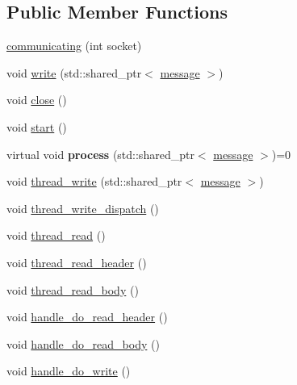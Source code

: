 \subsection*{Public Member Functions}
\begin{DoxyCompactItemize}
\item 
\hyperlink{classgal_1_1network_1_1communicating_adccfea2eeae7892217bf01f71f011d93}{communicating} (int socket)
\item 
void \hyperlink{classgal_1_1network_1_1communicating_ad839348b2caf46ddee874b78afaaeb1f}{write} (std\-::shared\-\_\-ptr$<$ \hyperlink{classgal_1_1network_1_1message}{message} $>$)
\item 
void \hyperlink{classgal_1_1network_1_1communicating_a3b39dcb940d746f44b6c2c72e198450d}{close} ()
\item 
void \hyperlink{classgal_1_1network_1_1communicating_a43bf55d2d11f1798b4814e069639a239}{start} ()
\item 
\hypertarget{classgal_1_1network_1_1communicating_a04bfdd09b09438aefb4683050437a211}{virtual void {\bfseries process} (std\-::shared\-\_\-ptr$<$ \hyperlink{classgal_1_1network_1_1message}{message} $>$)=0}\label{classgal_1_1network_1_1communicating_a04bfdd09b09438aefb4683050437a211}

\item 
void \hyperlink{classgal_1_1network_1_1communicating_ae183aa977aa6963e96a1abe2a94a749c}{thread\-\_\-write} (std\-::shared\-\_\-ptr$<$ \hyperlink{classgal_1_1network_1_1message}{message} $>$)
\item 
void \hyperlink{classgal_1_1network_1_1communicating_a32da51cf806bdc60b1a653ef20557af9}{thread\-\_\-write\-\_\-dispatch} ()
\item 
void \hyperlink{classgal_1_1network_1_1communicating_abd5efaa6563dda2097f69ae3679f87a1}{thread\-\_\-read} ()
\item 
void \hyperlink{classgal_1_1network_1_1communicating_aa7ef767d5117ba5d99cddcb1d7696a1d}{thread\-\_\-read\-\_\-header} ()
\item 
void \hyperlink{classgal_1_1network_1_1communicating_aeba5f8e491d9c6a4ddd75aa0a698bed9}{thread\-\_\-read\-\_\-body} ()
\item 
void \hyperlink{classgal_1_1network_1_1communicating_ab1434959e6a6b7311e7189078679124f}{handle\-\_\-do\-\_\-read\-\_\-header} ()
\item 
void \hyperlink{classgal_1_1network_1_1communicating_a383465f75d9d656a0e80ea3f57963630}{handle\-\_\-do\-\_\-read\-\_\-body} ()
\item 
void \hyperlink{classgal_1_1network_1_1communicating_a5a0d9fbfe61ff1d35380854d8aa3860e}{handle\-\_\-do\-\_\-write} ()
\end{DoxyCompactItemize}
